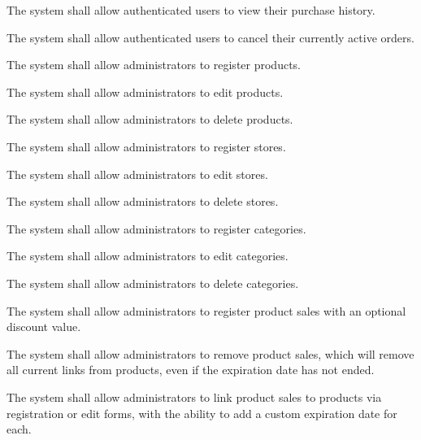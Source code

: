 {
The system shall allow authenticated users to view their purchase history.
}

{
The system shall allow authenticated users to cancel their currently active orders.
}

{
The system shall allow administrators to register products.
}

{
The system shall allow administrators to edit products.
}

{
The system shall allow administrators to delete products.
}

{
The system shall allow administrators to register stores.
}

{
The system shall allow administrators to edit stores.
}

{
The system shall allow administrators to delete stores.
}

{
The system shall allow administrators to register categories.
}

{
The system shall allow administrators to edit categories.
}

{
The system shall allow administrators to delete categories.
}

{
The system shall allow administrators to register product sales with an optional discount value.
}

{
The system shall allow administrators to remove product sales, which will remove all current links from products, even if the expiration date has not ended.
}

{
The system shall allow administrators to link product sales to products via registration or edit forms, with the ability to add a custom expiration date for each.
}
